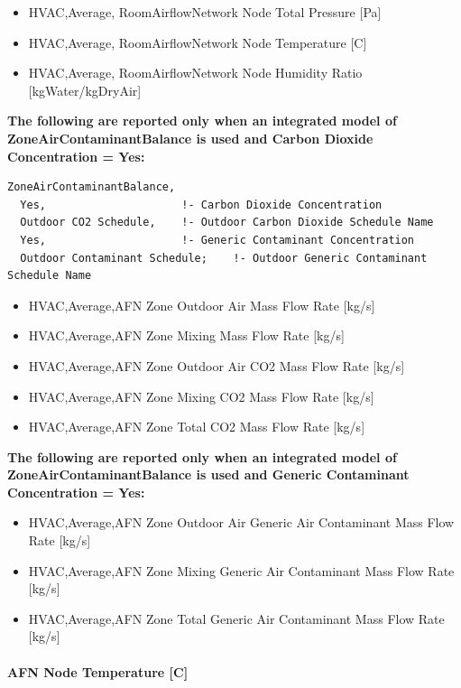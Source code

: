 \begin{itemize}
\item
  HVAC,Average, RoomAirflowNetwork Node Total Pressure {[}Pa{]}
\item
  HVAC,Average, RoomAirflowNetwork Node Temperature {[}C{]}
\item
  HVAC,Average, RoomAirflowNetwork Node Humidity Ratio {[}kgWater/kgDryAir{]}
\end{itemize}

\textbf{The following are reported only when an integrated model of ZoneAirContaminantBalance is used and Carbon Dioxide Concentration = Yes:}

\begin{lstlisting}
ZoneAirContaminantBalance,
  Yes,                     !- Carbon Dioxide Concentration
  Outdoor CO2 Schedule,    !- Outdoor Carbon Dioxide Schedule Name
  Yes,                     !- Generic Contaminant Concentration
  Outdoor Contaminant Schedule;    !- Outdoor Generic Contaminant Schedule Name
\end{lstlisting}


\begin{itemize}
\item
  HVAC,Average,AFN Zone Outdoor Air Mass Flow Rate {[}kg/s{]}
\item
  HVAC,Average,AFN Zone Mixing Mass Flow Rate {[}kg/s{]}
\item
  HVAC,Average,AFN Zone Outdoor Air CO2 Mass Flow Rate {[}kg/s{]}
\item
  HVAC,Average,AFN Zone Mixing CO2 Mass Flow Rate {[}kg/s{]}
\item
  HVAC,Average,AFN Zone Total CO2 Mass Flow Rate {[}kg/s{]}
\end{itemize}

\textbf{The following are reported only when an integrated model of ZoneAirContaminantBalance is used and Generic Contaminant Concentration = Yes:}

\begin{itemize}
\item
  HVAC,Average,AFN Zone Outdoor Air Generic Air Contaminant Mass Flow Rate {[}kg/s{]}
\item
  HVAC,Average,AFN Zone Mixing Generic Air Contaminant Mass Flow Rate {[}kg/s{]}
\item
  HVAC,Average,AFN Zone Total Generic Air Contaminant Mass Flow Rate {[}kg/s{]}

\end{itemize}

\paragraph{AFN Node Temperature {[}C{]}}\label{afn-node-temperature-c}

